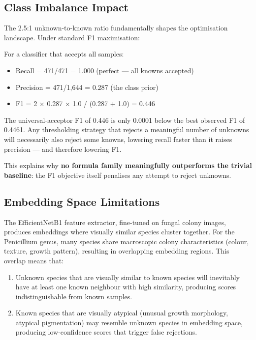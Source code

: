\documentclass[11pt,a4paper]{article}
\newcommand{\bestf}{0.4461}
\begin{document}
\subsection{Class Imbalance Impact}

The 2.5:1 unknown-to-known ratio fundamentally shapes the optimisation landscape. Under standard F1 maximisation:

\begin{tcolorbox}[colback=red!3, colframe=red!40, title={\textbf{The Class Imbalance Trap}}, fonttitle=\bfseries]
For a classifier that accepts all samples:
\begin{itemize}
  \item Recall = 471/471 = 1.000 (perfect --- all knowns accepted)
  \item Precision = 471/1{,}644 = 0.287 (the class prior)
  \item F1 = 2 $\times$ 0.287 $\times$ 1.0 / (0.287 $+$ 1.0) = 0.446
\end{itemize}
\noindent The universal-acceptor F1 of 0.446 is only 0.0001 below the best observed F1 of \bestf. Any thresholding strategy that rejects a meaningful number of unknowns will necessarily also reject some knowns, lowering recall faster than it raises precision --- and therefore lowering F1.
\end{tcolorbox}

\noindent This explains why \textbf{no formula family meaningfully outperforms the trivial baseline}: the F1 objective itself penalises any attempt to reject unknowns.

\subsection{Embedding Space Limitations}

The EfficientNetB1 feature extractor, fine-tuned on fungal colony images, produces embeddings where visually similar species cluster together. For the Penicillium genus, many species share macroscopic colony characteristics (colour, texture, growth pattern), resulting in overlapping embedding regions. This overlap means that:

\begin{enumerate}
  \item Unknown species that are visually similar to known species will inevitably have at least one known neighbour with high similarity, producing scores indistinguishable from known samples.
  \item Known species that are visually atypical (unusual growth morphology, atypical pigmentation) may resemble unknown species in embedding space, producing low-confidence scores that trigger false rejections.
\end{enumerate}
\end{document}
